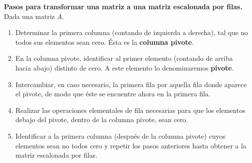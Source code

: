 \documentclass[compacto,10pt]{pubciencias-notas}
\begin{document}
\textbf{Pasos para transformar una matriz a una matriz escalonada por filas.} Dada una matriz $A$.
\begin{enumerate}
\item Determinar la primera columna (contando de izquierda a derecha), tal que no todos sus elementos sean cero. Ésta es la \textbf{columna pivote}.
\item En la columna pivote, identificar al primer elemento (contando de arriba hacia abajo) distinto de cero. A este elemento lo denominaremos \textbf{pivote}.
\item Intercambiar, en caso necesario, la primera fila por aquella fila donde aparece el pivote, de modo que éste se encuentre ahora en la primera fila.
\item Realizar las operaciones elementales de fila necesarias para que los elementos debajo del pivote, dentro de la columna pivote, sean cero.
\item Identificar a la primera columna (después de la columna pivote) cuyos elementos sean no todos cero y repetir los pasos anteriores hasta obtener a la matriz escalonada por filas.
\end{enumerate}
\end{document}
